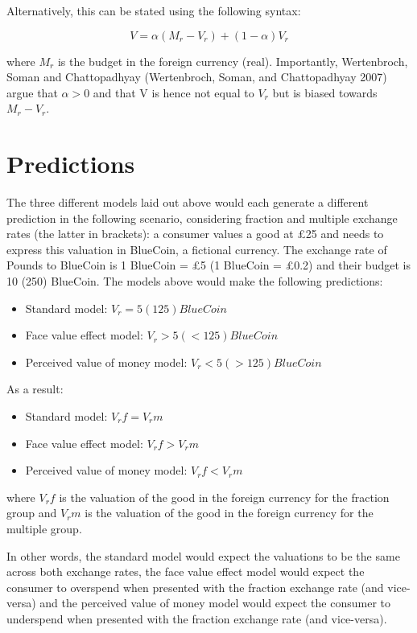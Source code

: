 \documentclass[
]{report}
\providecommand{\tightlist}{%
  \setlength{\itemsep}{0pt}\setlength{\parskip}{0pt}}\usepackage{longtable,booktabs,array}
\begin{document}
Alternatively, this can be stated using the following syntax:

\[V = α(M_r - V_r) + (1 - α)V_r\]

where \(M_r\) is the budget in the foreign currency (real). Importantly,
Wertenbroch, Soman and Chattopadhyay (Wertenbroch, Soman, and
Chattopadhyay 2007) argue that \(α > 0\) and that V is hence not equal
to \(V_r\) but is biased towards \(M_r - V_r\).

\section{Predictions}\label{predictions}

The three different models laid out above would each generate a
different prediction in the following scenario, considering fraction and
multiple exchange rates (the latter in brackets): a consumer values a
good at £25 and needs to express this valuation in BlueCoin, a fictional
currency. The exchange rate of Pounds to BlueCoin is 1 BlueCoin = £5 (1
BlueCoin = £0.2) and their budget is 10 (250) BlueCoin. The models above
would make the following predictions:

\begin{itemize}
\tightlist
\item
  Standard model: \(V_r = 5 (125) BlueCoin\)
\item
  Face value effect model: \(V_r > 5 (< 125) BlueCoin\)
\item
  Perceived value of money model: \(V_r < 5 (> 125) BlueCoin\)
\end{itemize}

As a result:

\begin{itemize}
\tightlist
\item
  Standard model: \(V_rf = V_rm\)
\item
  Face value effect model: \(V_rf > V_rm\)
\item
  Perceived value of money model: \(V_rf < V_rm\)
\end{itemize}

where \(V_rf\) is the valuation of the good in the foreign currency for
the fraction group and \(V_rm\) is the valuation of the good in the
foreign currency for the multiple group.

In other words, the standard model would expect the valuations to be the
same across both exchange rates, the face value effect model would
expect the consumer to overspend when presented with the fraction
exchange rate (and vice-versa) and the perceived value of money model
would expect the consumer to underspend when presented with the fraction
exchange rate (and vice-versa).
\end{document}
